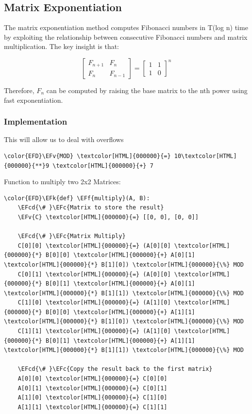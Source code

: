\documentclass[a4paper,12pt]{article}
\newcommand{\EFc}[1]{\textcolor{EFc}{#1}} %
\newcommand{\EFcd}[1]{\textcolor{EFcd}{#1}} %
\newcommand{\EFk}[1]{\textcolor{EFk}{#1}} %
\newcommand{\EFf}[1]{\textcolor{EFf}{#1}} %
\newcommand{\EFv}[1]{\textcolor{EFv}{#1}} %
\begin{document}
\subsection{Matrix Exponentiation}
\label{sec:orgd07de13}
The matrix exponentiation method computes Fibonacci numbers in T(log n) time by exploiting the relationship between consecutive Fibonacci numbers and matrix multiplication. The key insight is that:

\[ \begin{bmatrix} F_{n+1} & F_n \\ F_n & F_{n-1} \end{bmatrix} = \begin{bmatrix} 1 & 1 \\ 1 & 0 \end{bmatrix}^n \]

Therefore, \(F_n\) can be computed by raising the base matrix to the nth power using fast exponentiation.
\subsubsection{Implementation}
\label{sec:org711ff9b}
This will allow us to deal with overflows
\begin{Code}
\begin{Verbatim}
\color{EFD}\EFv{MOD} \textcolor[HTML]{000000}{=} 10\textcolor[HTML]{000000}{**}9 \textcolor[HTML]{000000}{+} 7
\end{Verbatim}
\end{Code}

Function to multiply two 2x2 Matrices:
\begin{Code}
\begin{Verbatim}
\color{EFD}\EFk{def} \EFf{multiply}(A, B):
    \EFcd{\# }\EFc{Matrix to store the result}
    \EFv{C} \textcolor[HTML]{000000}{=} [[0, 0], [0, 0]]

    \EFcd{\# }\EFc{Matrix Multiply}
    C[0][0] \textcolor[HTML]{000000}{=} (A[0][0] \textcolor[HTML]{000000}{*} B[0][0] \textcolor[HTML]{000000}{+} A[0][1] \textcolor[HTML]{000000}{*} B[1][0]) \textcolor[HTML]{000000}{\%} MOD
    C[0][1] \textcolor[HTML]{000000}{=} (A[0][0] \textcolor[HTML]{000000}{*} B[0][1] \textcolor[HTML]{000000}{+} A[0][1] \textcolor[HTML]{000000}{*} B[1][1]) \textcolor[HTML]{000000}{\%} MOD
    C[1][0] \textcolor[HTML]{000000}{=} (A[1][0] \textcolor[HTML]{000000}{*} B[0][0] \textcolor[HTML]{000000}{+} A[1][1] \textcolor[HTML]{000000}{*} B[1][0]) \textcolor[HTML]{000000}{\%} MOD
    C[1][1] \textcolor[HTML]{000000}{=} (A[1][0] \textcolor[HTML]{000000}{*} B[0][1] \textcolor[HTML]{000000}{+} A[1][1] \textcolor[HTML]{000000}{*} B[1][1]) \textcolor[HTML]{000000}{\%} MOD

    \EFcd{\# }\EFc{Copy the result back to the first matrix}
    A[0][0] \textcolor[HTML]{000000}{=} C[0][0]
    A[0][1] \textcolor[HTML]{000000}{=} C[0][1]
    A[1][0] \textcolor[HTML]{000000}{=} C[1][0]
    A[1][1] \textcolor[HTML]{000000}{=} C[1][1]
\end{Verbatim}
\end{Code}
\end{document}
